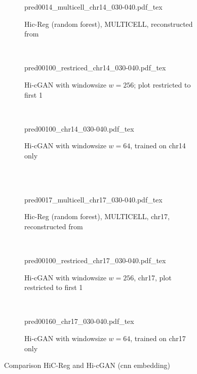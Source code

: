 \begin{figure}[htbp]
\begin{subfigure}{\textwidth}
 \centering
 \scriptsize
 {pred0014_multicell_chr14_030-040.pdf_tex}
 \caption{Hic-Reg (random forest), MULTICELL, reconstructed from \cite{Zhang2019}} \label{fig:results:zhang-vs-ours_matrices_multicell-14}
\end{subfigure}\\[5mm]
\begin{subfigure}{\textwidth}
 \centering
 \scriptsize
 {pred00100_restriced_chr14_030-040.pdf_tex}
 \caption{Hi-cGAN with windowsize $w=256$; plot restricted to first \SI{1}{\mega\bp}} \label{fig:results:zhang-vs-ours_matrices_ours-full-14}
\end{subfigure}\\[5mm]
\begin{subfigure}{\textwidth}
 \centering
 \scriptsize
 {pred00100_chr14_030-040.pdf_tex}
 \caption{Hi-cGAN with windowsize $w=64$, trained on chr14 only} \label{fig:results:zhang-vs-ours_matrices_ours-only-14}
\end{subfigure}\\[4mm]
    \\[5mm]
    \begin{subfigure}{\textwidth}
 \centering
 \scriptsize
 {pred0017_multicell_chr17_030-040.pdf_tex}
 \caption{Hic-Reg (random forest), MULTICELL, chr17, reconstructed from \cite{Zhang2019}} \label{fig:results:zhang-vs-ours_matrices_multicell-17}
\end{subfigure}\\[5mm]
\begin{subfigure}{\textwidth}
 \centering
 \scriptsize
 {pred00100_restriced_chr17_030-040.pdf_tex}
 \caption{Hi-cGAN with windowsize $w=256$, chr17, plot restricted to first \SI{1}{\mega\bp}}\label{fig:results:zhang-vs-ours_matrices_ours-full-17}
\end{subfigure}\\[5mm]
\begin{subfigure}{\textwidth}
 \centering
 \scriptsize
 {pred00160_chr17_030-040.pdf_tex}
 \caption{Hi-cGAN with windowsize $w=64$, trained on chr17 only} \label{fig:results:zhang-vs-ours_matrices_ours-only-17}
\end{subfigure}
\caption{Comparison HiC-Reg \cite{Zhang2019} and Hi-cGAN (\acrshort{cnn} embedding)} \label{fig:results:zhang-vs-ours_matrices}
\end{figure}

